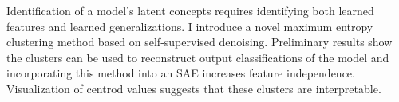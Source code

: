 Identification of a model's latent concepts requires identifying both learned features and learned generalizations.
I introduce a novel maximum entropy clustering method based on self-supervised denoising.
Preliminary results show the clusters can be used to reconstruct output classifications of the model and incorporating this method into an SAE increases feature independence.
Visualization of centrod values suggests that these clusters are interpretable.
